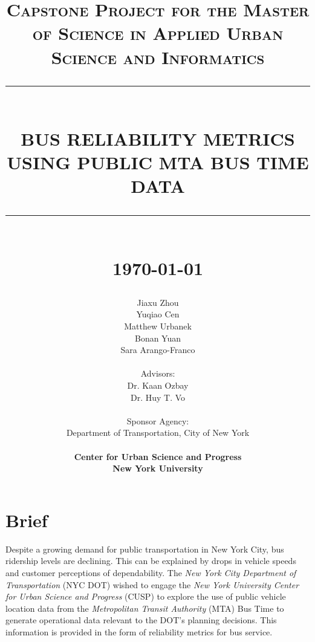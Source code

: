 \documentclass[12pt]{report}
\newcommand{\HRule}[1]{\rule{\linewidth}{#1}}
\begin{document}
\title{ \normalsize \textsc{Capstone Project for the Master of Science in Applied Urban Science and Informatics}
		\\ [2.0cm]
		\HRule{0.5pt} \\
		\LARGE \textbf{\uppercase{Bus Reliability Metrics using Public MTA Bus Time Data}}
		\HRule{2pt} \\ [0.5cm]
		\normalsize \today %
		}

\date{}

		\author{
				Jiaxu Zhou \\
				Yuqiao Cen \\
				Matthew Urbanek \\
				Bonan Yuan \\
				Sara Arango-Franco \\ 
				\\
				Advisors: \\
				Dr. Kaan Ozbay \\
				Dr. Huy T. Vo \\
				\\
				Sponsor Agency:\\
				Department of Transportation, City of New York\\
				\\
		\textbf{Center for Urban Science and Progress} \\
		\textbf{New York University}}
		
	

\maketitle
\tableofcontents
\newpage

\sectionfont{\scshape}


\section*{Brief}

Despite a growing demand for public transportation in New York City, bus ridership levels are declining.  This can be explained by drops in vehicle speeds and customer perceptions of dependability.  The \textit{New York City Department of Transportation} (NYC DOT) wished to engage the \textit{New York University Center for Urban Science and Progress} (CUSP) to explore the use of public vehicle location data from the \textit{Metropolitan Transit Authority} (MTA) Bus Time to generate operational data relevant to the DOT's planning decisions.  This information is provided in the form of reliability metrics for bus service.
\end{document}
